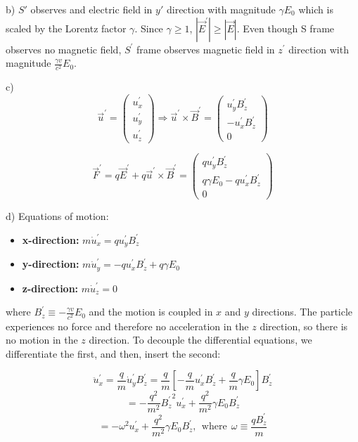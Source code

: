 \documentclass[12pt]{article}
\begin{document}
\begin{enumerate}
b) $S'$ observes and electric field in $y'$ direction with magnitude $\gamma E_0$ which is scaled by the Lorentz factor $\gamma$. Since $\gamma \ge 1$, $|\vec{E}^{\prime}| \ge |\vec{E}|$. Even though S frame observes no magnetic field, $S^{\prime}$ frame observes magnetic field in $z^{\prime}$ direction with magnitude $\frac{\gamma v}{c^2}E_0$.

c)\[
\vec{u}^{\prime} = \begin{pmatrix} u_x^{\prime} \\ u_y^{\prime} \\ u_z^{\prime} \end{pmatrix} \Rightarrow \vec{u}^{\prime} \times \vec{B}^{\prime} = \begin{pmatrix} u_y^{\prime} B_z^{\prime} \\ -u_x^{\prime} B_z^{\prime} \\ 0 \end{pmatrix}
\]

\[
\vec{F}^{\prime} = q\vec{E}^{\prime} + q\vec{u}^{\prime} \times \vec{B}^{\prime} = \begin{pmatrix} q u_y^{\prime} B_z^{\prime} \\ q \gamma E_0 - q u_x^{\prime} B_z^{\prime} \\ 0 \end{pmatrix}
\]

d) Equations of motion:
\begin{itemize}
    \item \textbf{x-direction:} $m \dot{u}_x^{\prime} = q u_y^{\prime} B_z^{\prime}$
    \item \textbf{y-direction:} $m \dot{u}_y^{\prime} = -q u_x^{\prime} B_z^{\prime} + q \gamma E_0$
    \item \textbf{z-direction:} $m \dot{u}_z^{\prime} = 0$
\end{itemize}

where $B_z^{\prime} \equiv -\frac{\gamma v}{c^2} E_0$ and the motion is coupled in $x$ and $y$ directions. The particle experiences no force and therefore no acceleration in the $z$ direction, so there is no motion in the $z$ direction. To decouple the differential equations, we differentiate the first, and then, insert the second:

\[
\ddot{u}_x^{\prime} = \frac{q}{m} \dot{u}_y^{\prime} B_z^{\prime} = \frac{q}{m} \left[ -\frac{q}{m} u_x^{\prime} B_z^{\prime} + \frac{q}{m} \gamma E_0 \right] B_z^{\prime}
\]
\[
= -\frac{q^2}{m^2} {B_z^{\prime}}^2 u_x^{\prime} + \frac{q^2}{m^2} \gamma E_0 B_z^{\prime}
\]
\[
= -\omega^2 u_x^{\prime} + \frac{q^2}{m^2} \gamma E_0 B_z^{\prime}, ~~\text{where}~~ \omega \equiv \frac{q B_z^{\prime}}{m}
\]


\end{enumerate}
\end{document}
